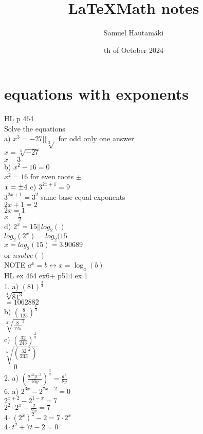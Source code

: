 \documentclass{article}
\title{\LaTeX Math notes}
\author{Samuel Hautamäki}
\date{th of October 2024}
\begin{document}
  \maketitle
   
  \section{equations with exponents}
  HL p 464 \\
  Solve the equations\\
  a) $x^3=-27 || \sqrt[3]{}$ for odd only one answer\\
  $x=\sqrt[3]{-27}$\\
  $x-3$\\
  b) $x^2-16=0$\\
  $x^2=16$ for even roots $\pm$\\
  $x=\pm4\\$
  c) $3^{2x+1}=9$\\
  $3^{2x+1}=3^2$ same base equal exponents\\
  $2x+1=2$\\
  $2x=1$\\
  $x=\frac{1}{2}$\\
  d) $2^x=15 || log_2()$\\
  $log_2(2^x)=log_2(15$\\
  $x=log_2(15)=3.90689$\\
  or $nsolve()$\\
  NOTE $a^x=b \leftrightarrow x = \log_a(b)$\\
  HL ex 464 ex6+ p514 ex 1\\ 
  1. a) $(81)^\frac{3}{4}$\\
  $\sqrt[4]{81^3}$\\
  $=1062882$\\
  b) $(\frac{8}{125})^{\frac{1}{3}}$\\
  $\sqrt[3]{\frac{8}{125}^1}$\\
  c) $(\frac{32}{243})^{\frac{2}{5}}$\\
  $\sqrt[5]{(\frac{32}{243}^2)}$\\
  $=0$\\
  2. a) $(\frac{a^{12}y^{-3}}{16y})^{\frac{3}{4}}=\frac{a^9}{8y}$\\
  6.
  a) $2^{3x}-2^{7x-2}=0$\\
  $2^{x+2}-2^{1-x}=7$\\
  $2^2\cdot 2^x-\frac{2}{2x}=7$\\
  $4\cdot(2^x)^2-2=7\cdot 2^x$\\
  $4\cdot t^2+7t-2=0$\\
\end{document}
